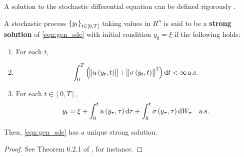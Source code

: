 A solution to the stochastic differential equation can be defined rigorously \cite{KallianpurSundar_2014_StochasticAnalysisDiffusion}.
\begin{defn}
	A stochastic process \(\set{y_t}_{t \in [0,T]}\) taking values in \(R^n\) is said to be a \textbf{strong solution} of \eqref{eqn:gen_sde} with initial condition \(y_0 = \xi\) if the following holds:
	\begin{enumerate}
		\item For each \(t\),
		\item
		      \[
			      \int_0^T{\left(\norm{u\left(y_t, t\right)} + \norm{\sigma\left(y_t, t\right)}^2\right)\dif t} < \infty \alsu
		      \]

		\item For each \(t \in [0,T]\),
			\[
				y_t = \xi + \int_0^t{u\left(y_\tau, \tau\right)\dif\tau} + \int_0^t{\sigma\left(y_\tau, \tau\right)\dif W_\tau} \quad \text{a.s.}
			\]
	\end{enumerate}
\end{defn}


\begin{theorem}
	



	Then, \eqref{eqn:gen_sde} has a unique strong solution.
\end{theorem}
\begin{proof}
	See Theorem 6.2.1 of \cite{KallianpurSundar_2014_StochasticAnalysisDiffusion}, for instance.
\end{proof}




